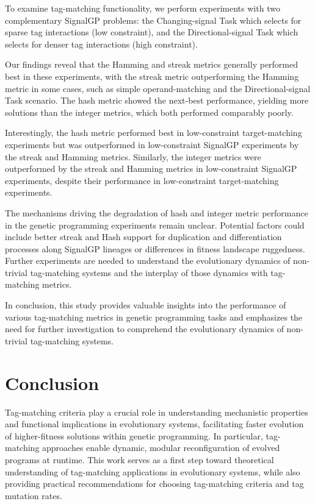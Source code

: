 To examine tag-matching functionality, we perform experiments with two complementary SignalGP problems: the Changing-signal Task which selects for sparse tag interactions (low constraint), and the Directional-signal Task which selects for denser tag interactions (high constraint).

Our findings reveal that the Hamming and streak metrics generally performed best in these experiments, with the streak metric outperforming the Hamming metric in some cases, such as simple operand-matching and the Directional-signal Task scenario.
The hash metric showed the next-best performance, yielding more solutions than the integer metrics, which both performed comparably poorly.

Interestingly, the hash metric performed best in low-constraint target-matching experiments but was outperformed in low-constraint SignalGP experiments by the streak and Hamming metrics.
Similarly, the integer metrics were outperformed by the streak and Hamming metrics in low-constraint SignalGP experiments, despite their performance in low-constraint target-matching experiments.

The mechanisms driving the degradation of hash and integer metric performance in the genetic programming experiments remain unclear.
Potential factors could include better streak and Hash support for duplication and differentiation processes along SignalGP lineages or differences in fitness landscape ruggedness.
Further experiments are needed to understand the evolutionary dynamics of non-trivial tag-matching systems and the interplay of those dynamics with tag-matching metrics.

In conclusion, this study provides valuable insights into the performance of various tag-matching metrics in genetic programming tasks and emphasizes the need for further investigation to comprehend the evolutionary dynamics of non-trivial tag-matching systems.

\section{Conclusion}

Tag-matching criteria play a crucial role in understanding mechanistic properties and functional implications in evolutionary systems, facilitating faster evolution of higher-fitness solutions within genetic programming.
In particular, tag-matching approaches enable dynamic, modular reconfiguration of evolved programs at runtime.
This work serves as a first step toward theoretical understanding of tag-matching applications in evolutionary systems, while also providing practical recommendations for choosing tag-matching criteria and tag mutation rates.

